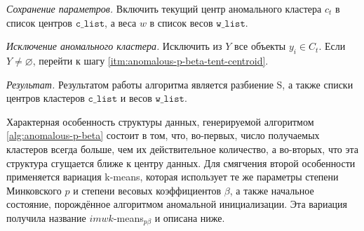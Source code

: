 \documentclass[12pt]{a&t}
\begin{document}
\begin{algorithm}
\begin{enumlist}[.]
		\item \label{itm:anomalous-p-beta-save} \textit{Сохранение параметров.} Включить текущий центр аномального кластера $ c_t $ в список центров $ \mathtt{c\_list} $, а веса $ w $ в список весов $ \mathtt{w\_list} $.
		
		\item \textit{Исключение аномального кластера.} Исключить из $ Y $ все объекты $ y_i \in C_t $. Если $ Y \neq \varnothing $, перейти к шагу \ref{itm:anomalous-p-beta-tent-centroid}.			
		
		\item \textit{ Результат.} Результатом работы алгоритма является разбиение S, а также списки центров кластеров $ \mathtt{c\_list} $ и весов $ \mathtt{w\_list} $.
	\end{enumlist}
\end{algorithm}

Характерная особенность структуры данных, генерируемой алгоритмом \ref{alg:anomalous-p-beta} состоит в том, что, во-первых, число получаемых кластеров всегда больше, чем их действительное количество, а во-вторых, что эта структура сгущается ближе к центру данных. Для смягчения второй особенности применяется вариация \mbox{k-means}, которая использует те же параметры степени Минковского $ p $ и степени весовых коэффициентов $ \beta $, а также начальное состояние, порождённое алгоритмом аномальной инициализации. Эта вариация получила название \mbox{$ imwk$-means$_{p\beta} $} и описана ниже.
\end{document}
